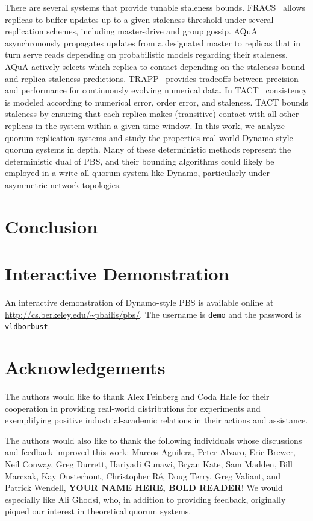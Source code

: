 \documentclass{vldb}
\begin{document}
There are several systems that provide tunable staleness bounds.
FRACS~\cite{frac} allows replicas to buffer updates up to a given
staleness threshold under several replication schemes, including
master-drive and group gossip.  AQuA~\cite{aqua} asynchronously
propagates updates from a designated master to replicas that in turn
serve reads depending on probabilistic models regarding their
staleness.  AQuA actively selects which replica to contact depending
on the staleness bound and replica staleness predictions.
TRAPP~\cite{trapp} provides tradeoffs between precision and
performance for continuously evolving numerical data.  In
TACT~\cite{vahdat-article, vahdat-bounded} consistency is modeled
according to numerical error, order error, and staleness.  TACT bounds
staleness by ensuring that each replica makes (transitive) contact
with all other replicas in the system within a given time window.  In
this work, we analyze quorum replication systems and study the
properties real-world Dynamo-style quorum systems in depth.  Many of
these deterministic methods represent the deterministic dual of PBS,
and their bounding algorithms could likely be employed in a write-all
quorum system like Dynamo, particularly under asymmetric network
topologies.


\section{Conclusion}
\label{sec:conclusion}

\section*{Interactive Demonstration}

An interactive demonstration of Dynamo-style PBS is available online at \url{http://cs.berkeley.edu/~pbailis/pbs/}.  The username is \texttt{demo} and the password is \texttt{vldborbust}.

\section*{Acknowledgements}

The authors would like to thank Alex Feinberg and Coda Hale for their
cooperation in providing real-world distributions for experiments and
exemplifying positive industrial-academic relations in their actions
and assistance.

The authors would also like to thank the following individuals whose
discussions and feedback improved this work: Marcos Aguilera, Peter
Alvaro, Eric Brewer, Neil Conway, Greg Durrett, Hariyadi Gunawi, Bryan
Kate, Sam Madden, Bill Marczak, Kay Ousterhout, Christopher R\'e, Doug
Terry, Greg Valiant, and Patrick Wendell, \textbf{YOUR NAME HERE, BOLD
  READER}!  We would especially like Ali Ghodsi, who, in addition to
providing feedback, originally piqued our interest in theoretical
quorum systems.
\end{document}
